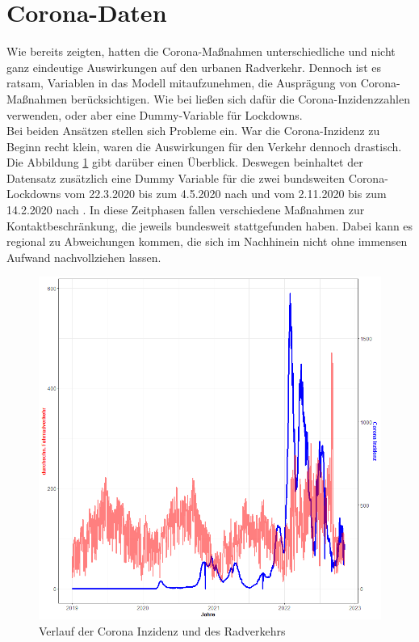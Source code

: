 \documentclass[a4paper,12pt]{thesis}
\begin{document}
\section{Corona-Daten}

Wie \cite{Moellers2021} bereits zeigten, hatten die Corona-Maßnahmen unterschiedliche und nicht ganz eindeutige Auswirkungen auf den urbanen Radverkehr. Dennoch ist es ratsam, Variablen in das Modell mitaufzunehmen, die Ausprägung von Corona-Maßnahmen berücksichtigen. Wie bei \cite{Moellers2021} ließen sich dafür die Corona-Inzidenzzahlen verwenden, oder aber eine Dummy-Variable für Lockdowns.\\
Bei beiden Ansätzen stellen sich Probleme ein. War die Corona-Inzidenz zu Beginn recht klein, waren die Auswirkungen für den Verkehr dennoch drastisch. Die Abbildung \ref{CoronaInzidenz} gibt darüber einen Überblick. Deswegen beinhaltet der Datensatz zusätzlich eine Dummy Variable für die zwei bundsweiten Corona-Lockdowns vom 22.3.2020 bis zum 4.5.2020 nach \cite{Kodzo2022} und vom 2.11.2020 bis zum 14.2.2020 nach \cite{Kodzo2022a}. In diese Zeitphasen fallen verschiedene Maßnahmen zur Kontaktbeschränkung, die jeweils bundesweit stattgefunden haben. Dabei kann es regional zu Abweichungen kommen, die sich im Nachhinein nicht ohne immensen Aufwand nachvollziehen lassen.

\begin{figure}[!ht]
	\centering
	\includegraphics[width=\textwidth]{Plots/plot62.png}
	\caption{Verlauf der Corona Inzidenz und des Radverkehrs}
	\label{CoronaInzidenz}
\end{figure}
\end{document}
